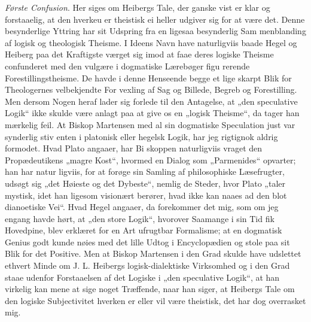 \documentclass[12pt]{book}
\newcommand{\opage}[1]{\marginnote{\footnotesize\textit{[#1]}}}
\begin{document}
\emph{Første Confusion}. Her siges om Heibergs Tale,
der ganske vist er klar og forstaaelig, at den hverkeu er theistisk
ei heller udgiver sig for at være det. Denne besynderlige
Yttring har sit Udspring fra en ligesaa besynderlig Sam\-%
menblanding af logisk og theologisk Theisme. I Ideens
Navn have naturligviis baade Hegel og Heiberg paa det
Kraftigste værget sig imod at faae deres logiske Theisme
confunderet med den vulgære i dogmatiske Lærebøger figu\-%
rerende Forestillingstheisme. De havde i denne Henseende
begge et lige skarpt Blik for Theologernes velbekjendte For\-%
vexling af Sag og Billede, Begreb og Forestilling. Men
dersom Nogen heraf lader sig forlede til den Antagelse, at
„den speculative Logik“ ikke skulde være anlagt paa at give
os en „logisk Theisme“, da tager han mærkelig feil. At
Biskop Martensen med al sin dogmatiske Speculation just
var synderlig stiv enten i platonisk eller hegelsk Logik, har
jeg rigtignok aldrig formodet. Hvad Plato angaaer, har Bi\-%
skoppen naturligviis vraget den Propædeutikens „magre Kost“,
hvormed en Dialog som „Parmenides“ opvarter; han har natur\-%
ligviis, for at forøge sin Samling af philosophiske Læsefrugter,
udsøgt sig „det Høieste og det Dybeste“, nemlig de Steder,
hvor Plato „taler mystisk, idet han ligesom visionært berører,
hvad ikke kan naaes ad den blot dianoetiske Vei“. Hvad
Hegel angaaer, da forekommer det mig, som om jeg engang
havde hørt, at „den store Logik“, hvorover Saamange i sin
\opage{122}\setcounter{footnote}{0}%
Tid fik Hovedpine, blev erklæret for en Art ufrugtbar
Formalisme; at en dogmatisk Genius godt kunde nøies med
det lille Udtog i Encyclopædien og stole paa sit Blik for det
Positive. Men at Biskop Martensen i den Grad skulde
have udslettet ethvert Minde om J. L. Heibergs logisk-dialektiske
Virksomhed og i den Grad staae udenfor Forstaaelsen af det
Logiske i „den speculative Logik“, at han virkelig kan mene
at sige noget Træffende, naar han siger, at Heibergs Tale
om den logiske Subjectivitet hverken er eller vil være theistisk,
det har dog overrasket mig.
\end{document}
